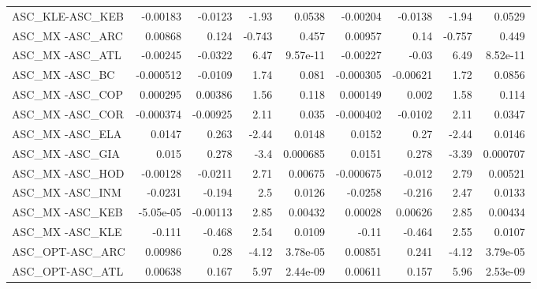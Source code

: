 \begin{tabular}{lrrrrrrrr}
ASC\_KLE-ASC\_KEB                        &    -0.00183 &      -0.0123 &   -1.93 &   0.0538 &   -0.00204 &     -0.0138 &        -1.94 &        0.0529 \\
ASC\_MX -ASC\_ARC                        &     0.00868 &        0.124 &  -0.743 &    0.457 &    0.00957 &        0.14 &       -0.757 &         0.449 \\
ASC\_MX -ASC\_ATL                        &    -0.00245 &      -0.0322 &    6.47 & 9.57e-11 &   -0.00227 &       -0.03 &         6.49 &      8.52e-11 \\
ASC\_MX -ASC\_BC                         &   -0.000512 &      -0.0109 &    1.74 &    0.081 &  -0.000305 &    -0.00621 &         1.72 &        0.0856 \\
ASC\_MX -ASC\_COP                        &    0.000295 &      0.00386 &    1.56 &    0.118 &   0.000149 &       0.002 &         1.58 &         0.114 \\
ASC\_MX -ASC\_COR                        &   -0.000374 &     -0.00925 &    2.11 &    0.035 &  -0.000402 &     -0.0102 &         2.11 &        0.0347 \\
ASC\_MX -ASC\_ELA                        &      0.0147 &        0.263 &   -2.44 &   0.0148 &     0.0152 &        0.27 &        -2.44 &        0.0146 \\
ASC\_MX -ASC\_GIA                        &       0.015 &        0.278 &    -3.4 & 0.000685 &     0.0151 &       0.278 &        -3.39 &      0.000707 \\
ASC\_MX -ASC\_HOD                        &    -0.00128 &      -0.0211 &    2.71 &  0.00675 &  -0.000675 &      -0.012 &         2.79 &       0.00521 \\
ASC\_MX -ASC\_INM                        &     -0.0231 &       -0.194 &     2.5 &   0.0126 &    -0.0258 &      -0.216 &         2.47 &        0.0133 \\
ASC\_MX -ASC\_KEB                        &   -5.05e-05 &     -0.00113 &    2.85 &  0.00432 &    0.00028 &     0.00626 &         2.85 &       0.00434 \\
ASC\_MX -ASC\_KLE                        &      -0.111 &       -0.468 &    2.54 &   0.0109 &      -0.11 &      -0.464 &         2.55 &        0.0107 \\
ASC\_OPT-ASC\_ARC                        &     0.00986 &         0.28 &   -4.12 & 3.78e-05 &    0.00851 &       0.241 &        -4.12 &      3.79e-05 \\
ASC\_OPT-ASC\_ATL                        &     0.00638 &        0.167 &    5.97 & 2.44e-09 &    0.00611 &       0.157 &         5.96 &      2.53e-09 \\

\end{tabular}
